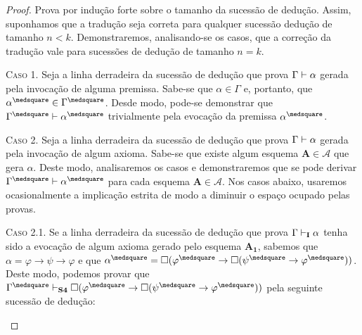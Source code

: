     \begin{proof}
        Prova por indução forte sobre o tamanho da sucessão de dedução.
        Assim, suponhamos que a tradução seja correta para qualquer sucessão dedução de tamanho $n < k$.
        Demonstraremos, analisando-se os casos, que a correção da tradução vale para sucessões de dedução de tamanho $n = k$.

        \begin{case}
            \textsc{Caso 1.}
            Seja a linha derradeira da sucessão de dedução que prova $\Gamma\mathrel{\vdash}\alpha$ gerada pela invocação de alguma premissa.
            Sabe-se que $\alpha\in\Gamma$ e, portanto, que $\alpha^\medsquare\in\Gamma^\medsquare$.
            Desde modo, pode-se demonstrar que $\Gamma^\medsquare\entails\alpha^\medsquare$ trivialmente pela evocação da premissa $\alpha^\medsquare$.
        \end{case}

        \begin{case}
            \textsc{Caso 2.}
            Seja a linha derradeira da sucessão de dedução que prova $\Gamma\mathrel{\vdash}\alpha$ gerada pela invocação de algum axioma.
            Sabe-se que existe algum esquema $\mathbf{A}\in\mathcal{A}$ que gera $\alpha$. 
            Deste modo, analisaremos os casos e demonstraremos que se pode derivar $\Gamma^\medsquare\entails\alpha^\medsquare$ para cada esquema $\mathbf{A}\in\mathcal{A}$.
            Nos casos abaixo, usaremos ocasionalmente a implicação estrita de modo a diminuir o espaço ocupado pelas provas.
        \end{case}

            \begin{subcase}
                \textsc{Caso 2.1.} Se a linha derradeira da sucessão de dedução que prova $\Gamma\mathrel{\vdash}_\mathbf{I}\alpha$ tenha sido a evocação de algum axioma gerado pelo esquema $\hyperref[IA1]{\mathbf{A_1}}$, sabemos que $\alpha=\varphi\to\psi\to\varphi$ e que $\alpha^\medsquare=\nec(\varphi^\medsquare\to\nec(\psi^\medsquare\to\varphi^\medsquare))$. Deste modo, podemos provar que $\Gamma^\medsquare\entails_\mathbf{S4}\nec(\varphi^\medsquare\to\nec(\psi^\medsquare\to\varphi^\medsquare))$ pela seguinte sucessão de dedução:


\end{subcase}
\end{proof}
